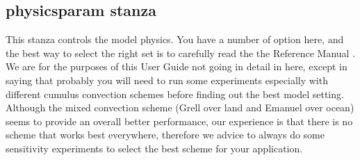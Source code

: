 \subsection{physicsparam stanza}
\label{physicsparam}

This stanza controls the model physics. You have a number of option here,
and the best way to select the right set is to carefully read the the
Reference Manual \cite{refman_11}. We are for the purposes of this User Guide
not going in detail in here, except in saying that probably you will need
to run some experiments especially with different cumulus convection
schemes before finding out the best model setting.
Although the mixed convection scheme (Grell over land and Emanuel over ocean)
seems to provide an overall better performance, our experience is that there
is no scheme that works best everywhere, therefore we advice to always do some
sensitivity experiments to select the best scheme for your application.

